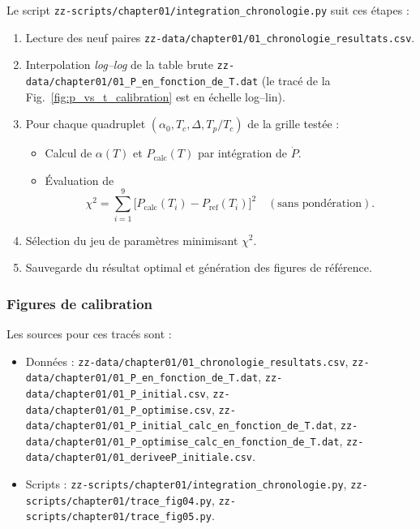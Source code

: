 Le script \texttt{zz-scripts/chapter01/integration\_chronologie.py} suit ces étapes :
\begin{enumerate}
  \item Lecture des neuf paires \texttt{zz-data/chapter01/01\_chronologie\_resultats.csv}.
  \item Interpolation \emph{log–log} de la table brute  
      \texttt{zz-data/chapter01/01\_P\_en\_fonction\_de\_T.dat}  
      (le tracé de la Fig.~\ref{fig:p_vs_t_calibration} est en échelle log–lin).
  \item Pour chaque quadruplet 
        \((\alpha_{0},T_{c},\Delta,T_{p}/T_{c})\) de la grille testée :
    \begin{itemize}
      \item Calcul de \(\alpha(T)\) et \(P_{\mathrm{calc}}(T)\) par intégration de \(\dot P\).  
      \item Évaluation de  
      \[
        \chi^{2}
        = 
        \sum_{i=1}^{9}
        \bigl[P_{\mathrm{calc}}(T_{i}) - P_{\mathrm{ref}}(T_{i})\bigr]^{2}
        \quad(\text{sans pondération}).
      \]
    \end{itemize}
  \item Sélection du jeu de paramètres minimisant \(\chi^{2}\).  
  \item Sauvegarde du résultat optimal et génération des figures de référence.
\end{enumerate}

\subsubsection{Figures de calibration}

Les sources pour ces tracés sont :
\begin{itemize}
  \item Données :  
    \texttt{zz-data/chapter01/01\_chronologie\_resultats.csv},  
    \texttt{zz-data/chapter01/01\_P\_en\_fonction\_de\_T.dat},  
    \texttt{zz-data/chapter01/01\_P\_initial.csv},  
    \texttt{zz-data/chapter01/01\_P\_optimise.csv},
    \texttt{zz-data/chapter01/01\_P\_initial\_calc\_en\_fonction\_de\_T.dat},  
    \texttt{zz-data/chapter01/01\_P\_optimise\_calc\_en\_fonction\_de\_T.dat}, 
    \texttt{zz-data/chapter01/01\_deriveeP\_initiale.csv}.
  \item Scripts :  
    \texttt{zz-scripts/chapter01/integration\_chronologie.py},  
    \texttt{zz-scripts/chapter01/trace\_fig04.py},  
    \texttt{zz-scripts/chapter01/trace\_fig05.py}.
\end{itemize}

